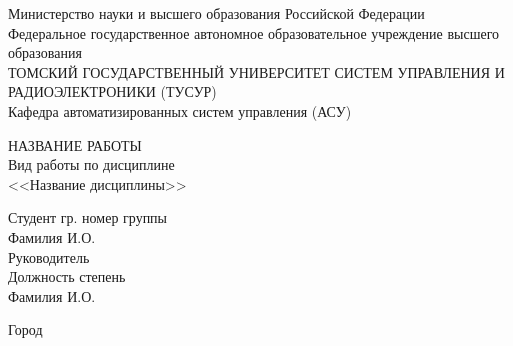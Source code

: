 



	\begin{titlepage}
		\begin{center}
			Министерство науки и высшего образования Российской Федерации\\
			\vspace*{14pt}
			Федеральное государственное автономное образовательное учреждение высшего образования\\
			ТОМСКИЙ ГОСУДАРСТВЕННЫЙ УНИВЕРСИТЕТ СИСТЕМ УПРАВЛЕНИЯ И РАДИОЭЛЕКТРОНИКИ (ТУСУР)\\
			\vspace*{14pt}
			Кафедра автоматизированных систем управления (АСУ)
		\end{center}
		
		\vspace*{\fill}
		
		\begin{center}
			\MakeTextUppercase{Название работы}\\
			\vspace*{14pt}
			Вид работы по дисциплине \\
			<<Название дисциплины>> \\
		\end{center}
		
		\vspace*{\fill}
		
        \begin{flushright}
            \begin{minipage}[t]{0.3\textwidth}
                \raggedright
                Студент гр. номер группы \\
                Фамилия И.О. \\
                \vspace*{14pt}
                Руководитель \\
                Должность степень \\
                Фамилия И.О. \\
            \end{minipage}
        \end{flushright}
		
		\vspace*{\fill}
		\begin{center}
			Город \the\year
		\end{center}
		
	\end{titlepage}
	
